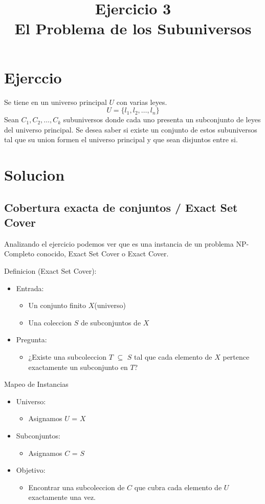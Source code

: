 \documentclass{article}
\title{Ejercicio 3 \\ El Problema de los Subuniversos}
\date{}
\begin{document}
\maketitle
\large
\section{Ejerccio}

Se tiene en un universo principal \(U\) con varias leyes.
\[U = \{ l_1, l_2, \dots, l_n \}\]
Sean \(C_1, C_2, \dots, C_k\) subuniversos donde cada uno presenta un subconjunto de leyes del universo principal. Se desea saber si existe un conjunto de estos subuniversos tal que su union formen el universo principal y que sean disjuntos entre si.


\section{Solucion}

\subsection{Cobertura exacta de conjuntos / Exact Set Cover}

Analizando el ejercicio podemos ver que es una instancia de un problema NP-Completo conocido, Exact Set Cover o Exact Cover.

Definicion (Exact Set Cover):

\begin{itemize}
\item Entrada:
    \begin{itemize}
    \item Un conjunto finito \(X\)(universo)
    \item Una coleccion \(S\) de subconjuntos de \(X\)
    \end{itemize}
\item Pregunta:
    \begin{itemize}
    \item ¿Existe una subcoleccion \(T\) $\subseteq$ \(S\)  tal que cada elemento de \(X\) pertence exactamente un subconjunto en \(T\)?
    \end{itemize}
\end{itemize}

Mapeo de Instancias
\begin{itemize}
\item Universo:
    \begin{itemize}
    \item Asignamos \(U\) = \(X\)
    \end{itemize}
\item Subconjuntos:
    \begin{itemize}
    \item Asignamos \(C\) = \(S\)
    \end{itemize}
\item Objetivo:
    \begin{itemize}
    \item Encontrar una subcoleccion de \(C\) que cubra cada elemento de \(U\) exactamente una vez.
    \end{itemize}
\end{itemize}
\end{document}
